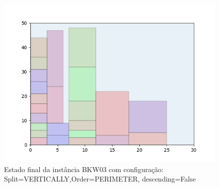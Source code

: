\begin{figure}[H]
    \centering
    \caption[]{Estado final da instância BKW03 com configuração: Split=VERTICALLY,Order=PERIMETER, descending=False}
    \label{fig:bkw03-vertically-perimeter-false}
    \includegraphics[scale=0.5]{output/figures/bkw/bkw03/vertically/perimeter/false/00}
\end{figure}